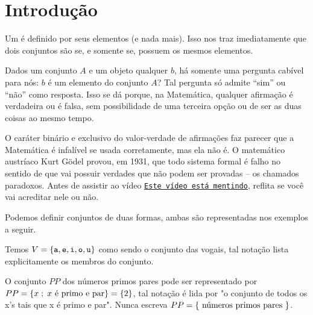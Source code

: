 \section{Introdução}
\label{sec:intro}
Um  é definido por seus elementos (e nada mais). Isso nos traz imediatamente que dois conjuntos são  se, e somente se, possuem os mesmos elementos.

Dados um conjunto $A$ e um objeto qualquer $b$, há somente uma pergunta cabível para nós: $b$ é um elemento do conjunto $A$? Tal pergunta só admite ``sim'' ou ``não'' como resposta. Isso se dá porque, na Matemática, qualquer afirmação é verdadeira ou é falsa, sem possibilidade de uma terceira opção ou de ser as duas coisas ao mesmo tempo. 

O caráter binário e exclusivo do valor-verdade de afirmações faz parecer que a Matemática é infalível se usada corretamente, mas ela não é. O matemático austríaco Kurt Gödel provou, em 1931, que todo sistema formal é falho no sentido de que vai possuir verdades que não podem ser provadas -- os chamados paradoxos. Antes de assistir ao vídeo \href{https://youtu.be/UI1xR_AECrU}{{\tt Este vídeo está mentindo}}, reflita se você vai acreditar nele ou não.

\begin{remark}
Podemos definir conjuntos de duas formas, ambas são representadas nos exemplos a seguir.
\end{remark}

\begin{example}
\label{ex-vogais}
Temos $V=\left\{ \texttt{a}, \texttt{e}, \texttt{i}, \texttt{o}, \texttt{u}\right\}$ como sendo o conjunto das vogais, tal notação lista explicitamente os membros do conjunto.
\end{example}

\begin{example}
\label{ex-primos-pares}
O conjunto $PP$ dos números primos pares pode ser representado por $PP = \left\{ x \;;\; x \text{ é primo e par}\right\} = \left\{ 2\right\}$, tal notação é lida por "o conjunto de todos os x's tais que x é primo e par". Nunca escreva $PP = \left\{ \text{ números primos pares }\right\}$.
\end{example}

%
